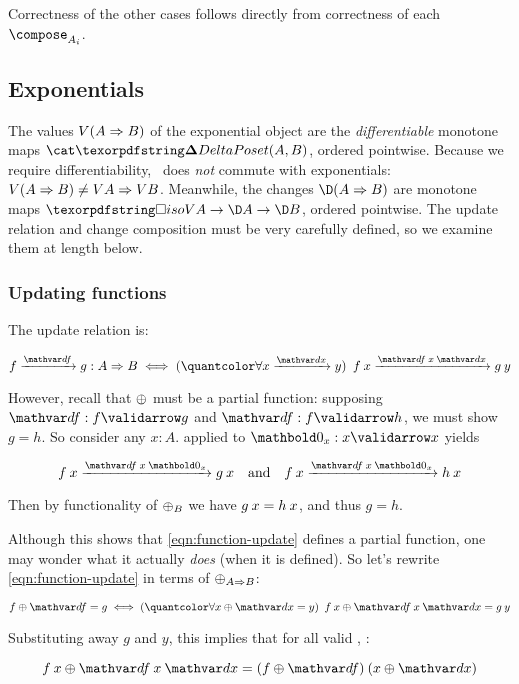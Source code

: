 Correctness of the other cases follows directly from correctness of each $\composefn_{A_i}$.


\subsection{Exponentials}
\label{sec:CP-exponentials}

The values $V{(A \Rightarrow B)}$ of the exponential object are the
\emph{differentiable} monotone maps $\CP(A, B)$, ordered pointwise. Because we
require differentiability, \valfn\ does \emph{not} commute with exponentials:
$V{(A \Rightarrow B)} \ne V A \Rightarrow V B$.
%
Meanwhile, the changes $\chgs{(\expO A B)}$ are monotone maps $\isof{\vals A}
\to \chgs A \to \chgs B$, ordered pointwise. The update relation and change
composition must be very carefully defined, so we examine them at length below.

\subsubsection{Updating functions}

The update relation is:

\nopagebreak[2]
\begin{equation}\label{eqn:function-update}
  \vld{\df}{f}{g} : \expO A B
  \iff \fa{\vld\dx x y} \vld{\df\<x\<\dx} {f\<x} {g\<y}
\end{equation}

\noindent However, recall that $\mathbin{\oplus}$ must be a partial function: supposing
$\valid\df f g$ and $\valid\df f h$, we must show $g = h$. So consider any $x :
A$.  applied to $\valid{\zero_x} x x$ yields

\nopagebreak[2]
\[ \vld{\df \<x \<\zero_x}{f \<x}{g\<x}
\quad\text{and}\quad \vld{\df \<x \<\zero_x}{f \<x}{h\<x} \]

\noindent
Then by functionality of ${\mathbin{\oplus}}_B$ we have $g\<x = h\<x$, and thus $g = h$.

Although this shows that \cref{eqn:function-update} defines a partial function,
one may wonder what it actually \emph{does} (when it is defined). So let's
rewrite \cref{eqn:function-update} in terms of $\mathbin{\oplus}_{A \Rightarrow B}$:

\nopagebreak[2]
\[ f \upd \df = g \iff \fa{x \upd \dx = y} f\<x \upd \df\<x\<\dx = g\<y \]

\noindent Substituting away $g$ and $y$, this implies that for all valid
\dx, \df:

\nopagebreak[2]
\[
f\<x \upd \df\<x\<\dx = (f \upd \df) \<(x \upd \dx)
\]

